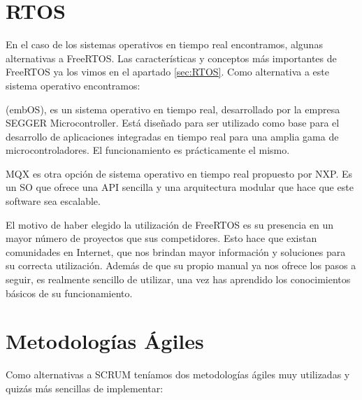\section{RTOS}\label{sec:ARRTOS}
En el caso de los sistemas operativos en tiempo real encontramos, algunas alternativas a FreeRTOS. Las características y conceptos más importantes de FreeRTOS ya los vimos en el apartado \ref{sec:RTOS}. Como alternativa a este sistema operativo encontramos: 
\begin{description}
\item {} (embOS), es un sistema operativo en tiempo real, desarrollado por la empresa SEGGER Microcontroller. Está diseñado para ser utilizado como base para el desarrollo de aplicaciones integradas en tiempo real para una amplia gama de microcontroladores. El funcionamiento es prácticamente el mismo.
\item MQX es otra opción de sistema operativo en tiempo real propuesto por NXP. Es un SO que ofrece una API sencilla y una arquitectura modular que hace que este software sea escalable.
\end{description}
El motivo de haber elegido la utilización de FreeRTOS es su presencia en un mayor número de proyectos que sus competidores. Esto hace que existan comunidades en Internet, que nos brindan mayor información y soluciones para su correcta utilización. Además de que su propio manual ya nos ofrece los pasos a seguir, es realmente sencillo de utilizar, una vez has aprendido los conocimientos básicos de su funcionamiento.

\section{Metodologías Ágiles}\label{sec:ARMetodologiasAgiles}

Como alternativas a SCRUM teníamos dos metodologías ágiles muy utilizadas y quizás más sencillas de implementar:

